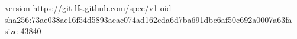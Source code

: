 version https://git-lfs.github.com/spec/v1
oid sha256:73ae038ae16f54d5893aeac074ad162cda6d7ba691dbc6af50c692a0007a63fa
size 43840
